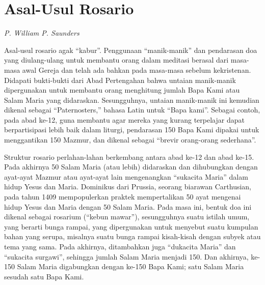\chapter*{Asal-Usul Rosario}

\begin{center}\textit{P. William P. Saunders}\end{center}

Asal-usul rosario agak ``kabur''. Penggunaan ``manik-manik'' dan pendarasan doa yang diulang-ulang untuk membantu orang dalam meditasi berasal dari masa-masa awal Gereja dan telah ada bahkan pada masa-masa sebelum kekristenan. Didapati bukti-bukti dari Abad Pertengahan bahwa untaian manik-manik dipergunakan untuk membantu orang menghitung jumlah Bapa Kami atau Salam Maria yang didaraskan. Sesungguhnya, untaian manik-manik ini kemudian dikenal sebagai ``Paternosters,'' bahasa Latin untuk ``Bapa kami''. Sebagai contoh, pada abad ke-12, guna membantu agar mereka yang kurang terpelajar dapat berpartisipasi lebih baik dalam liturgi, pendarasan 150 Bapa Kami dipakai untuk menggantikan 150 Mazmur, dan dikenal sebagai ``brevir orang-orang sederhana''.

Struktur rosario perlahan-lahan berkembang antara abad ke-12 dan abad ke-15. Pada akhirnya 50 Salam Maria (atau lebih) didaraskan dan dihubungkan dengan ayat-ayat Mazmur atau ayat-ayat lain mengenangkan ``sukacita Maria'' dalam hidup Yesus dan Maria. Dominikus dari Prussia, seorang biarawan Carthusian, pada tahun 1409 mempopulerkan praktek mempertalikan 50 ayat mengenai hidup Yesus dan Maria dengan 50 Salam Maria. Pada masa ini, bentuk doa ini dikenal sebagai rosarium (``kebun mawar''), sesungguhnya suatu istilah umum, yang berarti bunga rampai, yang dipergunakan untuk menyebut suatu kumpulan bahan yang serupa, misalnya suatu bunga rampai kisah-kisah dengan subyek atau tema yang sama. Pada akhirnya, ditambahkan juga ``dukacita Maria'' dan ``sukacita surgawi'', sehingga jumlah Salam Maria menjadi 150. Dan akhirnya, ke-150 Salam Maria digabungkan dengan ke-150 Bapa Kami; satu Salam Maria sesudah satu Bapa Kami.

